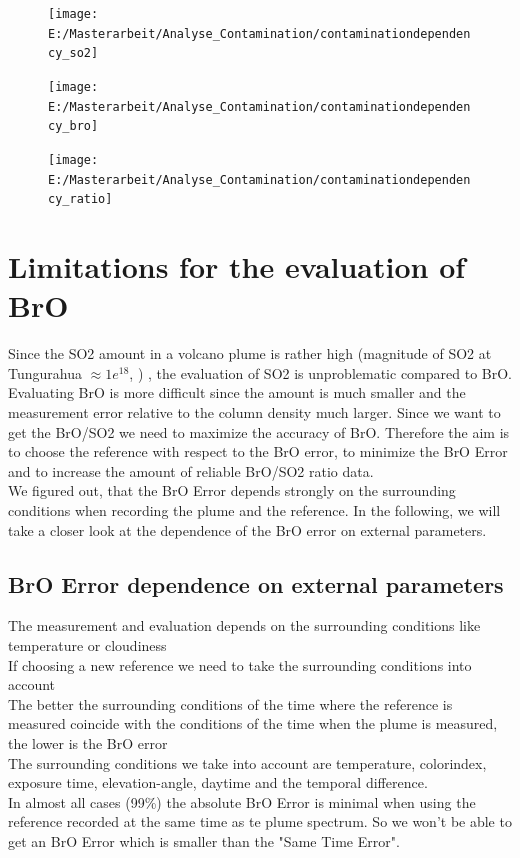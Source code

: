 \documentclass  [
  paper    = a4,
  BCOR     = 10mm,
  twoside,
  fontsize = 12pt,
  fleqn,
  toc      = bibnumbered,
  toc      = listofnumbered,
  numbers  = noendperiod,
  headings = normal,
  listof   = leveldown,
  version  = 3.03
]                                       {scrreprt}
\begin{document}
	\begin{figure}
		\centering
		\texttt{[image: E:/Masterarbeit/Analyse\_Contamination/contaminationdependency\_so2]}
		\caption{}
		\label{fig:contaminationdependencyso2}
	\end{figure}
	\begin{figure}
		\centering
		\texttt{[image: E:/Masterarbeit/Analyse\_Contamination/contaminationdependency\_bro]}
		\caption{}
		\label{fig:contaminationdependencybro}
	\end{figure}
	\begin{figure}
		\centering
		\texttt{[image: E:/Masterarbeit/Analyse\_Contamination/contaminationdependency\_ratio]}
		\caption{}
		\label{fig:contaminationdependencyratio}
	\end{figure}
	\chapter{Limitations for the evaluation of  BrO}
    Since the SO2 amount in a volcano plume is rather high (magnitude of SO2 at Tungurahua $\approx 1e^{18}$, \cite{WarnachSimon}) , the evaluation of SO2 is unproblematic compared to BrO.\\
	Evaluating BrO is more difficult since the amount is much smaller and the measurement error relative to the column density much larger. Since we want to get the BrO/SO2 we need to maximize the accuracy of BrO.
	Therefore the aim is to choose the reference with respect to the BrO error, to minimize the BrO Error and to increase the amount of reliable BrO/SO2 ratio data.\\
	We figured out, that the BrO Error depends strongly on the surrounding conditions when recording the plume and the reference. In the following, we will take a closer look at the dependence of the BrO error on external parameters. 
	\section{BrO Error dependence on external parameters}
	The measurement and evaluation depends on the surrounding conditions like temperature or cloudiness \cite{lubcke2014optical}\\
	If choosing a new reference we need to take the surrounding conditions into account\\
	The better the surrounding conditions of the time where the reference is measured coincide with the conditions of the time when the plume is measured, the lower is the BrO error \\
	The surrounding conditions we take into account are temperature, colorindex, exposure time, elevation-angle, daytime and the temporal difference.\\
	In almost all cases (99\%) the absolute BrO Error is minimal when using the reference recorded at the same time as te plume spectrum. So we won't be able to get an BrO Error which is smaller than the "Same Time Error".   
\end{document}
